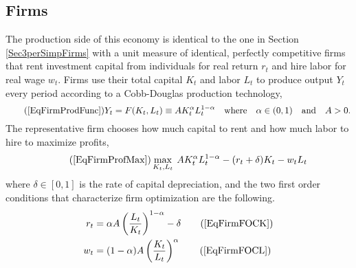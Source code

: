 \documentclass[letterpaper,12pt]{article}
\theoremstyle{definition}
\numberwithin{equation}{section}
\numberwithin{exercise}{section}
\begin{document}
\begin{spacing}{1.5}


   \subsection{Firms}\label{SecSperIntBeqFirms}

      The production side of this economy is identical to the one in Section \ref{Sec3perSimpFirms} with a unit measure of identical, perfectly competitive firms that rent investment capital from individuals for real return $r_t$ and hire labor for real wage $w_t$. Firms use their total capital $K_t$ and labor $L_t$ to produce output $Y_t$ every period according to a Cobb-Douglas production technology,
      \begin{equation}\tag{\ref{EqFirmProdFunc}}
         Y_t = F(K_t,L_t) \equiv AK_t^\alpha L_t^{1-\alpha}\quad\text{where}\quad \alpha\in(0,1) \quad\text{and}\quad A>0.
      \end{equation}
      The representative firm chooses how much capital to rent and how much labor to hire to maximize profits,
      \begin{equation}\tag{\ref{EqFirmProfMax}}
         \max_{K_t,L_t}\: AK_t^\alpha L_t^{1-\alpha} - (r_t + \delta)K_t - w_t L_t
      \end{equation}
      where $\delta\in[0,1]$ is the rate of capital depreciation, and the two first order conditions that characterize firm optimization are the following.
      \begin{align}
         r_t &= \alpha A\left(\frac{L_t}{K_t}\right)^{1-\alpha} - \delta \tag{\ref{EqFirmFOCK}} \\
         w_t &= (1-\alpha)A\left(\frac{K_t}{L_t}\right)^\alpha \tag{\ref{EqFirmFOCL}}
      \end{align}



\end{spacing}
\end{document}
